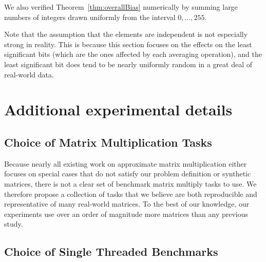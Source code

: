 We also verified Theorem~\ref{thm:overallBias} numerically by summing large numbers of integers drawn uniformly from the interval $0,\ldots,255$.

Note that the assumption that the elements are independent is not especially strong in reality. This is because this section focuses on the effects on the least significant bits (which are the ones affected by each averaging operation), and the least significant bit does tend to be nearly uniformly random in a great deal of real-world data.

\vfill\break  %
\section{Additional experimental details} \label{sec:experimentDetails}

\subsection{Choice of Matrix Multiplication Tasks}

Because nearly all existing work on approximate matrix multiplication either focuses on special cases that do not satisfy our problem definition \cite{quickerAdc, pq, opq} or synthetic matrices, there is not a clear set of benchmark matrix multiply tasks to use. We therefore propose a collection of tasks that we believe are both reproducible and representative of many real-world matrices. To the best of our knowledge, our experiments use over an order of magnitude more matrices than any previous study.

\subsection{Choice of Single Threaded Benchmarks}

